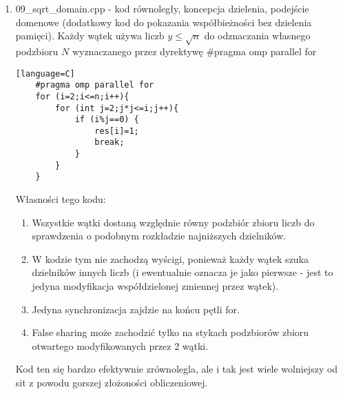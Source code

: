 \documentclass[12pt]{article}
\begin{document}
\begin {enumerate}
\begin{lstlisting}[style=mystyle, caption= Sito funkcyjne z dynamic schedulingiem][language=C]
	#pragma omp parallel
	{
		int thnum=omp_get_thread_num(), allth=omp_get_num_threads();
		int left=a+((n-a)/allth)*thnum, i, ji, j, finished=0, curfun=left;
		int right=left+(n-a)/allth-1;
		if (thnum==allth-1) right=n;
		if (left<=sq) left=sq+1;
		
		while (finished<ineo){
			curfun=curfun+outer;
			for (ji=0;ji<ineo;ji++){
				i=neoprimez[ji];
				if (dp[thnum][i]==0) dp[thnum][i]=max(modal(left, i), modal(a, i));
				for (j=dp[thnum][i]; j<=right;j+=i){
					if (j>=curfun) break;
					p[j]=1;	
				}
				if (j>right) finished++;
				dp[thnum][i]=j;
			}
		}
	}
\end{lstlisting}
Jedyną fundamentalną różnicą pomiędzy tym kodem a zwykłym sitem domenowym jest unikanie cache missów i dążenie do trzymania w L1 cache jak największej części aktualnie używanego sita. Poza tym złożoność może się zwiększyć, a przynajmniej nie jestem w stanie dowieść standardowej złożoności sita. To rozwiązanie pozwala efektywnie zrównoleglić zadanie uzyskując CPI=0.331 i czas przetwarzania 0.4s dla \(l=1, r=10^9\) na 4 rdzeniach, co pokażą wyniki VTune'a.

	\item 09\_sqrt\_domain.cpp - kod równoległy, koncepcja dzielenia, podejście domenowe (dodatkowy kod do pokazania współbieżności bez dzielenia pamięci). Każdy wątek używa liczb \(y\le\sqrt{n}\) do odznaczania własnego podzbioru \(N\) wyznaczanego przez dyrektywę \#pragma omp parallel for
	\begin{lstlisting}[style=mystyle, caption= Sito funkcyjne z dynamic schedulingiem][language=C]
	#pragma omp parallel for
	for (i=2;i<=n;i++){
		for (int j=2;j*j<=i;j++){
			if (i%j==0) {
				res[i]=1;
				break;
			}
		}
	}
	\end{lstlisting}
	Własności tego kodu:
	\begin{enumerate}
		\item Wszystkie wątki dostaną względnie równy podzbiór zbioru liczb do sprawdzenia o podobnym rozkładzie najniższych dzielników.
		\item W kodzie tym nie zachodzą wyścigi, ponieważ każdy wątek szuka dzielników innych liczb (i ewentualnie oznacza je jako pierwsze - jest to jedyna modyfikacja współdzielonej zmiennej przez wątek).
		\item Jedyna synchronizacja zajdzie na końcu pętli for.
		\item False sharing może zachodzić tylko na stykach podzbiorów zbioru otwartego modyfikowanych przez 2 wątki.
	\end{enumerate}
	Kod ten się bardzo efektywnie zrównolegla, ale i tak jest wiele wolniejszy od sit z powodu gorszej złożoności obliczeniowej.
\end {enumerate}
\end{document}
